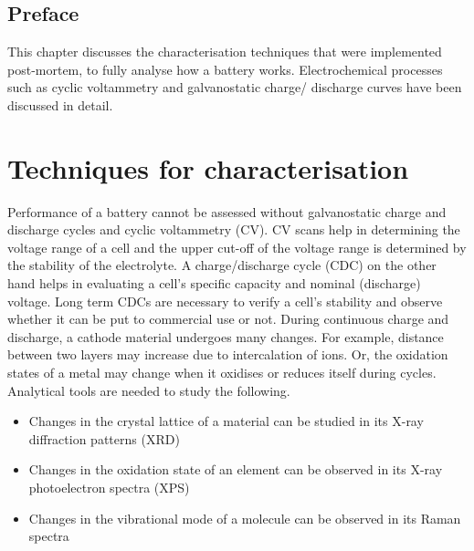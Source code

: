 \section*{\centering Preface}
This chapter discusses the characterisation techniques that were implemented post-mortem, to fully analyse how a battery works. Electrochemical processes such as cyclic voltammetry and galvanostatic charge/ discharge curves have been discussed in detail.   

\pagebreak

\chapter{Techniques for characterisation} %

\label{chap2} %

Performance of a battery cannot be assessed without galvanostatic charge and discharge cycles and cyclic voltammetry (CV). CV scans help in determining the voltage range of a cell and the upper cut-off of the voltage range is determined by the stability of the electrolyte. A charge/discharge cycle (CDC) on the other hand helps in evaluating a cell's specific capacity and nominal (discharge) voltage. Long term CDCs are necessary to verify a cell's stability and observe whether it can be put to commercial use or not. 
During continuous charge and discharge, a cathode material undergoes many changes. For example, distance between two layers may increase due to intercalation of ions. Or, the oxidation states of a metal may change when it oxidises or reduces itself during cycles. Analytical tools are needed to study the following. 

\begin{itemize}
    \item Changes in the crystal lattice of a material can be studied in its X-ray diffraction patterns (XRD)
    \item Changes in the oxidation state of an element can be observed in its X-ray photoelectron spectra (XPS)
    \item Changes in the vibrational mode of a molecule can be observed in its Raman spectra 
\end{itemize}

